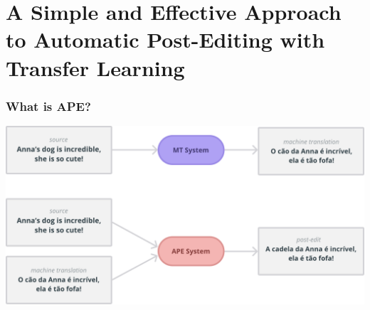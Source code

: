 \documentclass[xetex,aspectratio=169,xcolor,professionalfonts,hyperref]{beamer}
\begin{document}
\section{A Simple and Effective Approach to Automatic Post-Editing with Transfer Learning}

\begin{frame}
    \frametitle{What is APE?}
    \centering
    \includegraphics[width=0.8\columnwidth]{figures/ape.pdf}
\end{frame}
\end{document}
